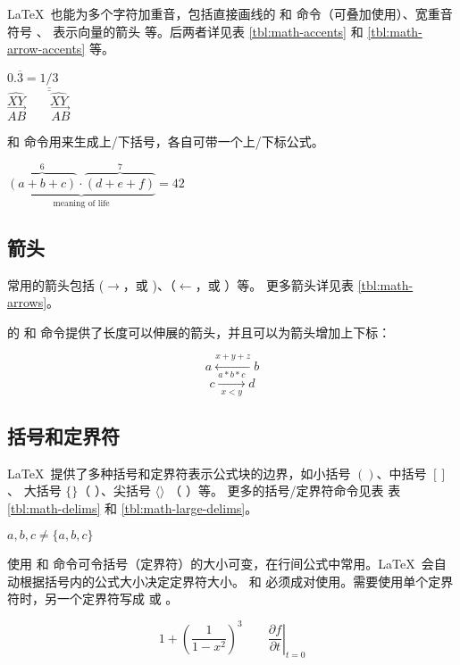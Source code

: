 \LaTeX\ 也能为多个字符加重音，包括直接画线的  和  命令（可叠加使用）、宽重音符号 、
表示向量的箭头  等。后两者详见表 \ref{tbl:math-accents} 和 \ref{tbl:math-arrow-accents} 等。
\begin{example}
$0.\overline{3} =
\underline{\underline{1/3}}$ \\[5pt]
$\hat{XY} \qquad \widehat{XY}$\\[5pt]
$\vec{AB} \qquad
\overrightarrow{AB}$
\end{example}

 和  命令用来生成上/下括号，各自可带一个上/下标公式。
\begin{example}
$\underbrace{\overbrace{(a+b+c)}^6
\cdot \overbrace{(d+e+f)}^7}
_\text{meaning of life} = 42$
\end{example}

\subsection{箭头}\label{subsec:math-arrows}

常用的箭头包括  ($\rightarrow$，或 )、（$\leftarrow$，或 ）等。
更多箭头详见表 \ref{tbl:math-arrows}。

 的  和  命令提供了长度可以伸展的箭头，并且可以为箭头增加上下标：
\begin{example}
\[ a\xleftarrow{x+y+z} b \]
\[ c\xrightarrow[x<y]{a*b*c}d \]
\end{example}

\subsection{括号和定界符}\label{subsec:math-delims}

\LaTeX\ 提供了多种括号和定界符表示公式块的边界，如小括号 $()$、中括号 $[]$、
大括号 $\{\}$（\cmd{\{} \cmd{\}}）、尖括号 $\langle \rangle$ （ ）等。
更多的括号/定界符命令见表 表 \ref{tbl:math-delims} 和 \ref{tbl:math-large-delims}。
\begin{example}
${a,b,c} \neq \{a,b,c\}$
\end{example}

使用  和  命令可令括号（定界符）的大小可变，在行间公式中常用。\LaTeX\ 会自动根据括号内的公式大小决定定界符大小。
 和  必须成对使用。需要使用单个定界符时，另一个定界符写成  或 。
\begin{example}
\[1 + \left(\frac{1}{1-x^{2}}
\right)^3 \qquad
\left.\frac{\partial f}{\partial t}
\right|_{t=0}\]
\end{example}

